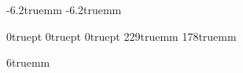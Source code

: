 \oddsidemargin  -6.2truemm
\evensidemargin -6.2truemm

\topmargin 0truept
\headheight 0truept
\headsep 0truept
\textheight 229truemm
\textwidth 178truemm

\twocolumn
\columnsep 6truemm
\pagestyle{empty}

\emergencystretch=11pt

\def\ninept{\def\baselinestretch{.95}\let\normalsize\small\normalsize}

\def\maketitle{\par
 \begingroup
 \def\thefootnote{}
 \def\@makefnmark{\hbox
 {$^{\@thefnmark}$\hss}}
 \if@twocolumn
 \twocolumn[\@maketitle]
 \else \newpage
 \global\@topnum\z@ \@maketitle \fi\@thanks
 \endgroup
 \setcounter{footnote}{0}
 \let\maketitle\relax
 \let\@maketitle\relax
 \gdef\thefootnote{\arabic{footnote}}\gdef\@@savethanks{}%
 \gdef\@thanks{}\gdef\@author{}\gdef\@title{}\let\thanks\relax}

\def\@maketitle{\newpage
 \null
 \vskip 2em \begin{center}
 {\large \bf \@title \par} \vskip 1.5em {\large \lineskip .5em
\begin{tabular}[t]{c}\@name \\ \@address
 \end{tabular}\par} \end{center}
 \par
 \vskip 1.5em}

\def\title#1{\gdef\@title{\uppercase{#1}}}
\def\name#1{\gdef\@name{{\em #1}\\}}
\def\address#1{\gdef\@address{#1}}
\gdef\@title{\uppercase{title of paper}}
\gdef\@name{{\em Name of author}\\}
\gdef\@address{Address - Line 1 \\
               Address - Line 2 \\
               Address - Line 3}



\def\twoauthors#1#2#3#4{\gdef\@address{}
   \gdef\@name{\begin{tabular}{@{}c@{}}
        {\em #1} \\ \\
        #2\relax
   \end{tabular}\hskip 1in\begin{tabular}{@{}c@{}}
        {\em #3} \\ \\
        #4\relax
\end{tabular}}}

